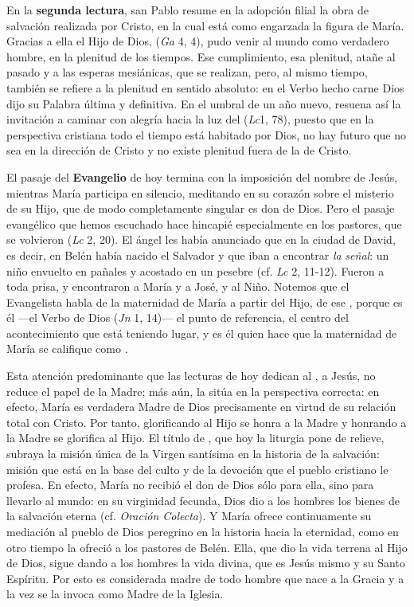 \begin{body}
\begin{body}
{En la \textbf{segunda lectura}, san Pablo resume en la adopción filial la obra de salvación realizada por Cristo, en la cual está como engarzada la figura de María. Gracias a ella el Hijo de Dios,  (\emph{Ga} 4, 4), pudo venir al mundo como verdadero hombre, en la plenitud de los tiempos. Ese cumplimiento, esa plenitud, atañe al pasado y a las esperas mesiánicas, que se realizan, pero, al mismo tiempo, también se refiere a la plenitud en sentido absoluto: en el Verbo hecho carne Dios dijo su Palabra última y definitiva. En el umbral de un año nuevo, resuena así la invitación a caminar con alegría hacia la luz del  (\emph{Lc}1, 78), puesto que en la perspectiva cristiana todo el tiempo está habitado por Dios, no hay futuro que no sea en la dirección de Cristo y no existe plenitud fuera de la de Cristo.

El pasaje del \textbf{Evangelio} de hoy termina con la imposición del nombre de Jesús, mientras María participa en silencio, meditando en su corazón sobre el misterio de su Hijo, que de modo completamente singular es don de Dios. Pero el pasaje evangélico que hemos escuchado hace hincapié especialmente en los pastores, que se volvieron  (\emph{Lc} 2, 20). El ángel les había anunciado que en la ciudad de David, es decir, en Belén había nacido el Salvador y que iban a encontrar \emph{la} \emph{señal}: un niño envuelto en pañales y acostado en un pesebre (cf. \emph{Lc} 2, 11-12). Fueron a toda prisa, y encontraron a María y a José, y al Niño. Notemos que el Evangelista habla de la maternidad de María a partir del Hijo, de ese , porque es él ---el Verbo de Dios (\emph{Jn} 1, 14)--- el punto de referencia, el centro del acontecimiento que está teniendo lugar, y es él quien hace que la maternidad de María se califique como .

Esta atención predominante que las lecturas de hoy dedican al , a Jesús, no reduce el papel de la Madre; más aún, la sitúa en la perspectiva correcta: en efecto, María es verdadera Madre de Dios precisamente en virtud de su relación total con Cristo. Por tanto, glorificando al Hijo se honra a la Madre y honrando a la Madre se glorifica al Hijo. El título de , que hoy la liturgia pone de relieve, subraya la misión única de la Virgen santísima en la historia de la salvación: misión que está en la base del culto y de la devoción que el pueblo cristiano le profesa. En efecto, María no recibió el don de Dios sólo para ella, sino para llevarlo al mundo: en su virginidad fecunda, Dios dio a los hombres los bienes de la salvación eterna (cf. \emph{Oración Colecta}). Y María ofrece continuamente su mediación al pueblo de Dios peregrino en la historia hacia la eternidad, como en otro tiempo la ofreció a los pastores de Belén. Ella, que dio la vida terrena al Hijo de Dios, sigue dando a los hombres la vida divina, que es Jesús mismo y su Santo Espíritu. Por esto es considerada madre de todo hombre que nace a la Gracia y a la vez se la invoca como Madre de la Iglesia.

}
\end{body}
\end{body}
